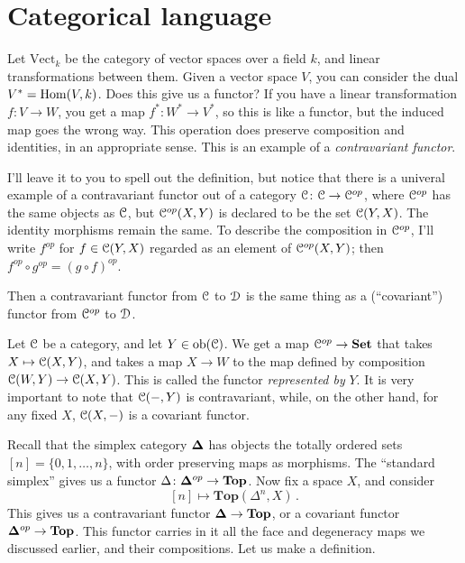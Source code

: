 \section{Categorical language}

Let $\mathrm{Vect}_k$ be the category of vector spaces over a field $k$, and linear transformations between them. Given a vector space $V$, you can consider the dual $V^\ast=\operatorname{Hom}(V,k)$. Does this give us a functor? If you have a linear transformation $f:V\to W$, you get a map $f^\ast:W^\ast\to V^\ast$, so this is like a functor, but the induced map goes the wrong way. This operation does preserve composition and identities, in an appropriate sense. This is an example of a {\em contravariant functor}. 

I'll leave it to you to spell out the definition, but notice that there is a univeral example of a contravariant functor out of a category $\mathcal C$: $\mathcal C\to\mathcal C^{op}$, where $\mathcal C^{op}$ has the same objects as $\mathcal C$, but $\mathcal C^{op}(X,Y)$ is declared to be the set $\mathcal C(Y,X)$. The identity morphisms remain the same. To describe the composition in $\mathcal C^{op}$, I'll write $f^{op}$ for $f\in\mathcal C(Y,X)$ regarded as an element of $\mathcal C^{op}(X,Y)$; then $f^{op}\circ g^{op}=(g\circ f)^{op}$. 

Then a contravariant functor from $\mathcal C$ to $\mathcal D$ is the same thing as a (``covariant'') functor from $\mathcal C^{op}$ to $\mathcal D$. 

Let $\mathcal C$ be a category, and let $Y\in\mathrm{ob}(\mathcal C)$. We get a map $\mathcal C^{op}\to\mathbf{Set}$ that takes $X\mapsto \mathcal C(X,Y)$, and takes a map $X\to W$ to the map defined by composition $\mathcal C(W,Y)\to \mathcal C(X,Y)$. This is called the functor {\em represented by} $Y$. It is very important to note that $\mathcal C(-,Y)$ is contravariant, while, on the other hand, for any fixed $X$, $\mathcal C(X,-)$ is a covariant functor.

\begin{example}
Recall that the simplex category ${\mathbf{\Delta}}$ has objects the totally ordered sets
$[n]=\{0,1,\ldots,n\}$, with order preserving maps as morphisms. The ``standard simplex'' gives us a functor $\Delta\colon{\mathbf{\Delta}}^{op}\to\mathbf{Top}$. Now fix a space $X$, and consider 
\[
[n]\mapsto\mathbf{Top}(\Delta^n,X)\,.
\]
This gives us a contravariant functor ${\mathbf{\Delta}}\to\mathbf{Top}$, or a covariant
functor ${\mathbf{\Delta}}^{op}\to\mathbf{Top}$. This functor carries in it all the face and degeneracy maps we discussed earlier, and their compositions. Let us make a definition.
\end{example}

